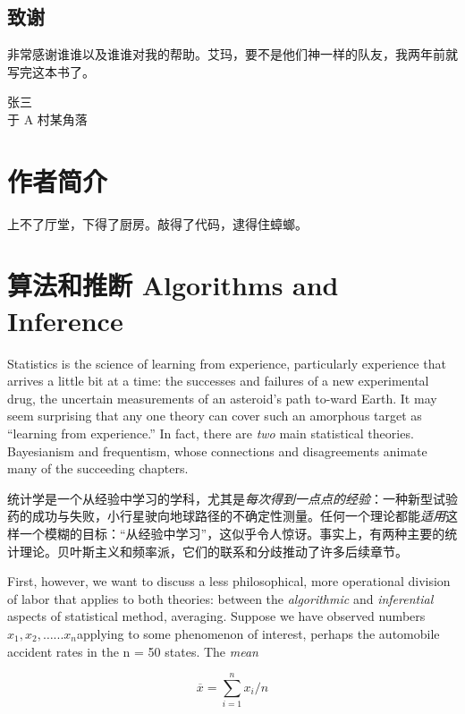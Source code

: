 \documentclass[]{ctexbook}
\theoremstyle{definition}
\theoremstyle{definition}
\theoremstyle{definition}
\theoremstyle{remark}
\let\BeginKnitrBlock\begin \let\EndKnitrBlock\end
\begin{document}
\section*{致谢}


非常感谢谁谁以及谁谁对我的帮助。艾玛，要不是他们神一样的队友，我两年前就写完这本书了。

\BeginKnitrBlock{flushright}
张三\\
于 A 村某角落
\EndKnitrBlock{flushright}

\hypertarget{author}{%
\chapter*{作者简介}\label{author}}


上不了厅堂，下得了厨房。敲得了代码，逮得住蟑螂。

\mainmatter

\hypertarget{intro}{%
\chapter{算法和推断 Algorithms and Inference}\label{intro}}

Statistics is the science of learning from experience, particularly
experience that arrives a little bit at a time: the successes and
failures of a new experimental drug, the uncertain measurements of an
asteroid's path to-ward Earth. It may seem surprising that any one
theory can cover such an amorphous target as ``learning from
experience.'' In fact, there are \emph{two} main statistical theories.
Bayesianism and frequentism, whose connections and disagreements animate
many of the succeeding chapters.

统计学是一个从经验中学习的学科，尤其是\emph{每次得到一点点的经验}：一种新型试验药的成功与失败，小行星驶向地球路径的不确定性测量。任何一个理论都能\emph{适用}这样一个模糊的目标：``从经验中学习''，这似乎令人惊讶。事实上，有两种主要的统计理论。贝叶斯主义和频率派，它们的联系和分歧推动了许多后续章节。

First, however, we want to discuss a less philosophical, more
operational division of labor that applies to both theories: between the
\emph{algorithmic} and \emph{inferential} aspects of statistical method,
averaging. Suppose we have observed numbers
\(x _ { 1 } , x _ { 2 } , \dots . . . x _ { n }\)applying to some
phenomenon of interest, perhaps the automobile accident rates in the n =
50 states. The \emph{mean}

\[
\overline { x } = \sum _ { i = 1 } ^ { n } x _ { i } / n
\]
\end{document}
